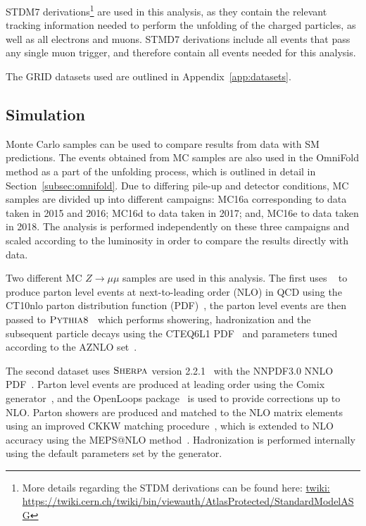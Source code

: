 STDM7 derivations\footnote{More details regarding the STDM derivations can be found here: \url{twiki: https://twiki.cern.ch/twiki/bin/viewauth/AtlasProtected/StandardModelASG}} are used in this analysis, as they contain the relevant tracking information needed to perform the
unfolding of the charged particles, as well as all electrons and muons. STMD7 derivations include all events that pass any single muon trigger, and therefore contain all events needed for this analysis.

The GRID datasets used are outlined in Appendix~\ref{app:datasets}.

\subsection{Simulation}
Monte Carlo samples can be used to compare results from data with SM predictions. The events obtained from MC samples are also used in the OmniFold method as a part of the unfolding process, which is outlined in detail in Section~\ref{subsec:omnifold}.
Due to differing pile-up and detector conditions, MC samples are divided up into different campaigns: MC16a corresponding to data taken in 2015 and 2016; MC16d to data taken in 2017; and, MC16e to data taken in 2018. The analysis is performed independently
on these three campaigns and scaled according to the luminosity in order to compare the results directly with data.

Two different MC $Z\rightarrow\mu\mu$ samples are used in this analysis. The first uses \powbox{}~\cite{Nason:2004rx,Frixione:2007vw,Alioli:2010xd} to produce parton level events at next-to-leading order (NLO) in QCD using the CT10nlo parton distribution function (PDF)~\cite{Lai:2010vv}, the parton level events are
then passed to $\textsc{Pythia8}$~\cite{Sjostrand:2007gs} which performs showering, hadronization and the subsequent particle decays using the CTEQ6L1 PDF~\cite{Lai:2010vv} and parameters tuned according to the AZNLO set~\cite{Aad:2014xaa}.

The second dataset uses $\textsc{Sherpa}$ version 2.2.1~\cite{Gleisberg:2008ta,Bothmann:2019yzt} with the NNPDF3.0 NNLO PDF~\cite{Ball:2012cx}. Parton level events are produced at leading order using the Comix generator~\cite{Gleisberg:2008fv}, and the OpenLoops package~\cite{Cascioli:2011va} is used to provide corrections up to NLO.
Parton showers are produced and matched to the NLO matrix elements using an improved CKKW matching procedure~\cite{Catani:2001cc,Hoeche:2009rj}, which is extended to NLO accuracy using the MEPS@NLO method~\cite{Hoeche:2012yf}. Hadronization is performed internally using the default parameters set by the generator.

